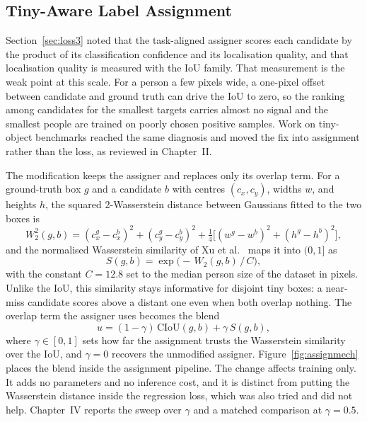 \subsection{Tiny-Aware Label Assignment}
\label{sec:assignmethod}
Section~\ref{sec:loss3} noted that the task-aligned assigner scores each
candidate by the product of its classification confidence and its localisation
quality, and that localisation quality is measured with the IoU family. That
measurement is the weak point at this scale. For a person a few pixels wide, a
one-pixel offset between candidate and ground truth can drive the IoU to zero,
so the ranking among candidates for the smallest targets carries almost no
signal and the smallest people are trained on poorly chosen positive samples.
Work on tiny-object benchmarks reached the same diagnosis and moved the fix
into assignment rather than the loss, as reviewed in Chapter~II.

The modification keeps the assigner and replaces only its overlap term. For a
ground-truth box $g$ and a candidate $b$ with centres $(c_x, c_y)$, widths $w$,
and heights $h$, the squared 2-Wasserstein distance between Gaussians fitted to
the two boxes is
\begin{equation}
  W_2^2(g,b) = (c_{x}^{g}-c_{x}^{b})^2 + (c_{y}^{g}-c_{y}^{b})^2
             + \tfrac{1}{4}\big[(w^{g}-w^{b})^2 + (h^{g}-h^{b})^2\big],
\end{equation}
and the normalised Wasserstein similarity of Xu et al.~\cite{xu2022nwdrka}
maps it into $(0,1]$ as
\begin{equation}
  S(g,b) = \exp\!\big(-\,W_2(g,b)\,/\,C\big),
\end{equation}
with the constant $C=12.8$ set to the median person size of the dataset in
pixels. Unlike the IoU, this similarity stays informative for disjoint tiny
boxes: a near-miss candidate scores above a distant one even when both overlap
nothing. The overlap term the assigner uses becomes the blend
\begin{equation}
  u = (1-\gamma)\,\mathrm{CIoU}(g,b) + \gamma\, S(g,b),
  \label{eq:blend}
\end{equation}
where $\gamma \in [0,1]$ sets how far the assignment trusts the Wasserstein
similarity over the IoU, and $\gamma=0$ recovers the unmodified assigner.
Figure~\ref{fig:assignmech} places the blend inside the assignment pipeline.
The change affects training only. It adds no parameters and no inference cost,
and it is distinct from putting the Wasserstein distance inside the regression
loss, which was also tried and did not help. Chapter~IV reports the sweep over
$\gamma$ and a matched comparison at $\gamma=0.5$.

